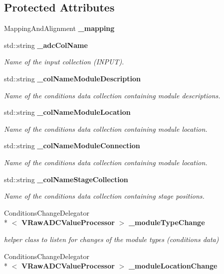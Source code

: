 \subsection*{Protected Attributes}
\begin{DoxyCompactItemize}
\item 
Mapping\-And\-Alignment {\bfseries \-\_\-mapping}\label{classCALICE_1_1VRawADCValueProcessor_a04dcae798efd66211f1fe66686e2fb60}

\item 
std\-::string {\bf \-\_\-adc\-Col\-Name}
\begin{DoxyCompactList}\small\item\em Name of the input collection (I\-N\-P\-U\-T). \end{DoxyCompactList}\item 
std\-::string {\bf \-\_\-col\-Name\-Module\-Description}
\begin{DoxyCompactList}\small\item\em Name of the conditions data collection containing module descriptions. \end{DoxyCompactList}\item 
std\-::string {\bf \-\_\-col\-Name\-Module\-Location}
\begin{DoxyCompactList}\small\item\em Name of the conditions data collection containing module location. \end{DoxyCompactList}\item 
std\-::string {\bf \-\_\-col\-Name\-Module\-Connection}
\begin{DoxyCompactList}\small\item\em Name of the conditions data collection containing module location. \end{DoxyCompactList}\item 
std\-::string {\bf \-\_\-col\-Name\-Stage\-Collection}
\begin{DoxyCompactList}\small\item\em Name of the conditions data collection containing stage positions. \end{DoxyCompactList}\item 
Conditions\-Change\-Delegator\\*
$<$ {\bf V\-Raw\-A\-D\-C\-Value\-Processor} $>$ {\bf \-\_\-module\-Type\-Change}\label{classCALICE_1_1VRawADCValueProcessor_af8af90b149e3fe18b894756535eb2cfe}

\begin{DoxyCompactList}\small\item\em helper class to listen for changes of the module types (conditions data) \end{DoxyCompactList}\item 
Conditions\-Change\-Delegator\\*
$<$ {\bf V\-Raw\-A\-D\-C\-Value\-Processor} $>$ {\bf \-\_\-module\-Location\-Change}\label{classCALICE_1_1VRawADCValueProcessor_af8355db99526cb3be8df7d5b0057a1ea}


\end{DoxyCompactItemize}

